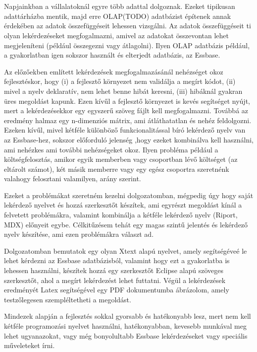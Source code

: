 \chapter*{\bevezeto}
Napjainkban a vállalatoknál egyre több adattal dolgoznak. Ezeket
tipikusan adattárházba mentik, majd erre OLAP(TODO) adatbázist építenek annak
érdekében az adatok összefüggéseit lehessen vizsgálni. Az adatok összefüggéseit
ti olyan lekérdezéseket megfogalmazni, amivel az adatokat
összevontan lehet megjeleníteni (például összegezni vagy átlagolni).
Ilyen OLAP adatbázis például, a gyakorlatban igen sokszor használt és elterjedt
adatbázis, az Essbase.

Az előzőekben említett lekérdezések megfogalmazásánál 
nehézséget okoz fejlesztéskor, hogy (i) a fejlesztő környezet nem validálja a megírt kódot, (ii) mivel a nyelv deklaratív, nem lehet benne hibát keresni, (iii) hibáknál gyakran üres megoldást kapunk. Ezen kívűl a fejlesztő környezet is kevés segítséget nyújt, mert a lekérdezésekkor egy egyszerű szöveg fájlt kell megfogalmazni.
Továbbá az eredmény halmaz egy n-dimenziós mátrix, ami átláthatatlan és nehéz feldolgozni. Ezeken
kívűl, mivel kétféle különböző funkcionalitással bíró lekérdező nyelv van az Essbase-hez, sokszor előforduló jelenség 
,hogy ezeket kombinálva kell használni, ami nehézkes ami további nehézségeket okoz. Ilyen probléma
például a költségfelosztás, amikor egyik memberben vagy csoportban lévő
költséget (az eltárolt számot), két másik memberre vagy egy egész csoportra
szeretnénk valahogy felosztani valamilyen, arány szerint.

Ezeket a problémákat szeretném kezelni dolgozatomban, mégpedig úgy hogy saját lekérdező nyelvet és hozzá szerkesztőt készítek, ami egyrészt megoldást kínál a felvetett problémákra, valamint kombinálja a kétféle lekérdező
nyelv (Riport, MDX) előnyeit egybe. Célkitűzésem tehát egy magas szintű jelentés
és lekérdező nyelv készítése, ami ezen problémákra választ ad.

Dolgozatomban bemutatok egy olyan Xtext alapú nyelvet, amely segítségéveé le lehet kérdezni az
Essbase adatbázisból, valamint hogy ezt a gyakorlatba is lehessen használni,
készítek hozzá egy szerkesztőt Eclipse alapú szöveges szerkesztőt, ahol a megírt lekérdezést
lehet futtatni. Végül a lekérdezések eredményét Latex segítségével egy PDF dokumentumba ábrázolom, amely testzőlegesen szempléltetheti a megoldást.

Mindezek alapján a fejlesztés sokkal gyorsabb és hatékonyabb lesz, mert nem kell
kétféle programozási nyelvet használni, hatékonyabban, kevesebb munkával meg
lehet ugyanazokat, vagy még bonyolultabb Essbase lekérdezéseket vagy speciális
műveleteket írni.



 
